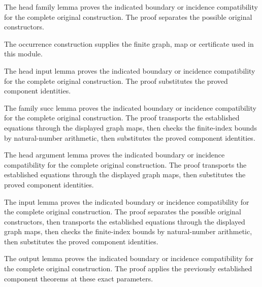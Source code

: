 The head family lemma proves the indicated boundary or incidence compatibility for the complete original construction.
The proof separates the possible original constructors.
\par{}

The occurrence construction supplies the finite graph, map or certificate used in this module.
\par{}

The head input lemma proves the indicated boundary or incidence compatibility for the complete original construction.
The proof substitutes the proved component identities.
\par{}

The family succ lemma proves the indicated boundary or incidence compatibility for the complete original construction.
The proof transports the established equations through the displayed graph maps, then checks the finite-index bounds by natural-number arithmetic, then substitutes the proved component identities.
\par{}

The head argument lemma proves the indicated boundary or incidence compatibility for the complete original construction.
The proof transports the established equations through the displayed graph maps, then substitutes the proved component identities.
\par{}

The input lemma proves the indicated boundary or incidence compatibility for the complete original construction.
The proof separates the possible original constructors, then transports the established equations through the displayed graph maps, then checks the finite-index bounds by natural-number arithmetic, then substitutes the proved component identities.
\par{}

The output lemma proves the indicated boundary or incidence compatibility for the complete original construction.
The proof applies the previously established component theorems at these exact parameters.
\par{}


